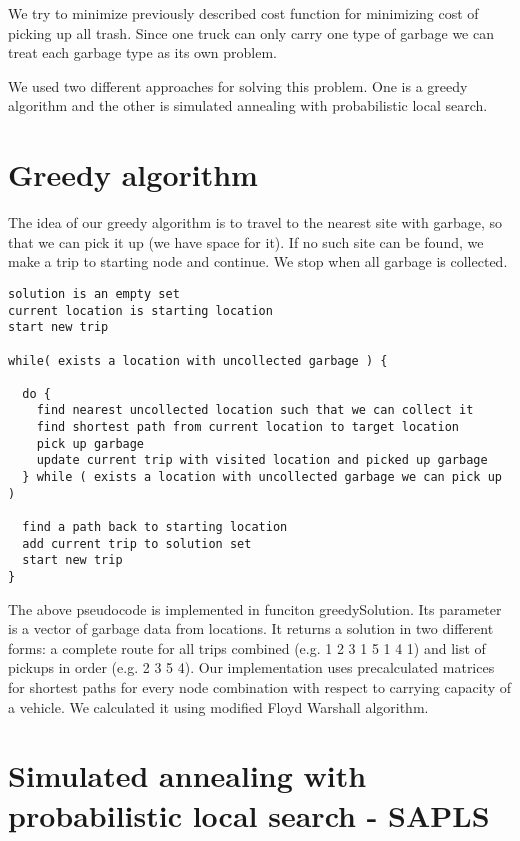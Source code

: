 \documentclass[a4paper, 12pt]{article}
\begin{document}
We try to minimize previously described cost function for minimizing cost of
picking up all trash. Since one truck can only carry one type of garbage we
can treat each garbage type as its own problem.

We used two different approaches for solving this problem. One is a greedy
algorithm and the other is simulated annealing with probabilistic local search.

\newpage

\section{Greedy algorithm}

The idea of our greedy algorithm is to travel to the nearest site with garbage,
so that we can pick it up (we have space for it). If no such site can be found,
we make a trip to starting node and continue. We stop when all garbage is
collected.

\begin{lstlisting}[basicstyle=\small]
solution is an empty set
current location is starting location
start new trip

while( exists a location with uncollected garbage ) {

  do {
    find nearest uncollected location such that we can collect it
    find shortest path from current location to target location
    pick up garbage
    update current trip with visited location and picked up garbage
  } while ( exists a location with uncollected garbage we can pick up )

  find a path back to starting location
  add current trip to solution set
  start new trip
}
\end{lstlisting}

The above pseudocode is implemented in funciton {\sf greedySolution}. Its
parameter is a vector of garbage data from locations. It returns a solution in
two different forms: a complete route for all trips combined (e.g. 1 2 3 1 5 1
4 1) and list of pickups in order (e.g. 2 3 5 4). Our implementation uses
precalculated matrices for shortest paths for every node combination with
respect to carrying capacity of a vehicle. We calculated it using modified
Floyd Warshall algorithm.

\newpage

\section{Simulated annealing with probabilistic local search - SAPLS}
\end{document}
